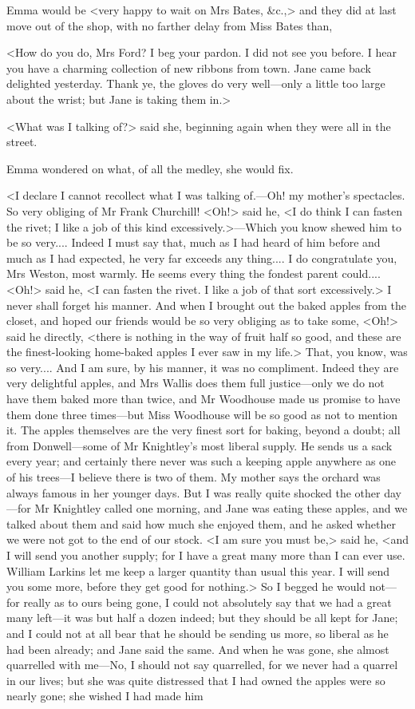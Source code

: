 Emma would be <very happy to wait on Mrs Bates, \&c.,> and they did at last move out of the shop, with no farther delay from Miss Bates than,

<How do you do, Mrs Ford? I beg your pardon. I did not see you before. I hear you have a charming collection of new ribbons from town. Jane came back delighted yesterday. Thank ye, the gloves do very well—only a little too large about the wrist; but Jane is taking them in.>

<What was I talking of?> said she, beginning again when they were all in the street.

Emma wondered on what, of all the medley, she would fix.

<I declare I cannot recollect what I was talking of.—Oh! my mother's spectacles. So very obliging of Mr Frank Churchill! <Oh!> said he, <I do think I can fasten the rivet; I like a job of this kind excessively.>—Which you know shewed him to be so very.... Indeed I must say that, much as I had heard of him before and much as I had expected, he very far exceeds any thing.... I do congratulate you, Mrs Weston, most warmly. He seems every thing the fondest parent could.... <Oh!> said he, <I can fasten the rivet. I like a job of that sort excessively.> I never shall forget his manner. And when I brought out the baked apples from the closet, and hoped our friends would be so very obliging as to take some, <Oh!> said he directly, <there is nothing in the way of fruit half so good, and these are the finest-looking home-baked apples I ever saw in my life.> That, you know, was so very.... And I am sure, by his manner, it was no compliment. Indeed they are very delightful apples, and Mrs Wallis does them full justice—only we do not have them baked more than twice, and Mr Woodhouse made us promise to have them done three times—but Miss Woodhouse will be so good as not to mention it. The apples themselves are the very finest sort for baking, beyond a doubt; all from Donwell—some of Mr Knightley's most liberal supply. He sends us a sack every year; and certainly there never was such a keeping apple anywhere as one of his trees—I believe there is two of them. My mother says the orchard was always famous in her younger days. But I was really quite shocked the other day—for Mr Knightley called one morning, and Jane was eating these apples, and we talked about them and said how much she enjoyed them, and he asked whether we were not got to the end of our stock. <I am sure you must be,> said he, <and I will send you another supply; for I have a great many more than I can ever use. William Larkins let me keep a larger quantity than usual this year. I will send you some more, before they get good for nothing.> So I begged he would not—for really as to ours being gone, I could not absolutely say that we had a great many left—it was but half a dozen indeed; but they should be all kept for Jane; and I could not at all bear that he should be sending us more, so liberal as he had been already; and Jane said the same. And when he was gone, she almost quarrelled with me—No, I should not say quarrelled, for we never had a quarrel in our lives; but she was quite distressed that I had owned the apples were so nearly gone; she wished I had made him 